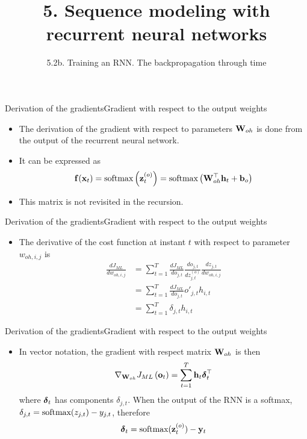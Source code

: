\documentclass{beamer}
\title[5. Recurrent neural networks]{5. Sequence modeling with recurrent neural networks}
\subtitle{5.2b. Training an RNN. The backpropagation through time}
\begin{document}
\maketitle

\begin{frame}{Derivation of the gradients}{Gradient with respect to the output weights}
\begin{itemize}
\item The derivation of the gradient with respect to parameters ${\bf W}_{oh}$ is done from the  output of the recurrent neural network.
\item It can be expressed as 
\begin{equation}
    {\bf f}({\bf x}_t)  =  \text{softmax}\left({\bf z}^{(o)}_{t}\right) =\text{softmax}\left({\bf W}_{oh}^\top{\bf h}_{t} +{\bf b}_o\right) 
\end{equation}
\item This matrix is not revisited in the recursion.
\end{itemize}
\end{frame}

\begin{frame}{Derivation of the gradients}{Gradient with respect to the output weights}
\begin{itemize}
\item The derivative of the cost function at instant $t$ with respect to parameter $w_{oh,i,j}$ is
\begin{equation}\label{eq:gradient_RNN_oh}
\begin{split}
\frac{dJ_{ML}}{dw_{oh,i,j}}&=\sum_{t=1}^T\frac{dJ_{ML}}{do_{j,t}} \frac{do_{j,t}}{dz^{(o)}_{j,t}}\frac{dz_{j,t}}{dw_{oh,i,j}}\\
&=\sum_{t=1}^T\frac{dJ_{ML}}{do_{j,t}} o'_{j,t}h_{i,t}\\
&=\sum_{t=1}^T\delta_{j,t}h_{i,t}
\end{split}
\end{equation}
\end{itemize}
\end{frame}

\begin{frame}{Derivation of the gradients}{Gradient with respect to the output weights}
\begin{itemize}
    \item In vector notation, the gradient with respect matrix ${\bf W}_{oh}$ is then  
\begin{equation}\label{eq:gradient_oh}
 \nabla_{{\bf W}_{oh}}J_{ML}\left( {\bf o}_t \right)  =  \sum_{t=1}^T   {\bf h}_{t}{\boldsymbol \delta}_{t}^\top 
\end{equation}
where ${\boldsymbol \delta}_t$ has components $\delta_{j,t}$. When the output of the RNN is a softmax, $\delta_{j,t} =  \text{softmax}(z_{j,t}) - y_{j,t}$, therefore 
\begin{equation}\label{eq:delta_output_RR}
    {\boldsymbol \delta}_{t} = \text{softmax}({\bf z}^{(o)}_{t}) - {\bf y}_{t}
\end{equation}
\end{itemize}
\end{frame}
\end{document}
